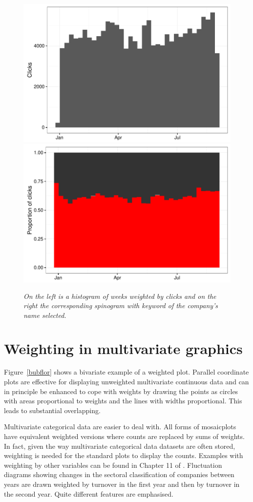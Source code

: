 \documentclass{svmult}
\begin{document}
\begin{figure}[htbp]
  \centering
  \includegraphics[width=0.5\linewidth]{web-clicks}%
  \includegraphics[width=0.5\linewidth]{web-clicks-stacked}
  \caption{\label{webwords2}\em On the left is a histogram of weeks weighted by clicks and on the right the corresponding spinogram with keyword of the company's name selected.}
\end{figure}


\section{Weighting in multivariate graphics}
\label{mv}
Figure~\ref{bubflor} shows a bivariate example of a weighted plot.  Parallel coordinate plots are effective for displaying unweighted multivariate continuous data and can in principle be enhanced to cope with weights by drawing the points as circles with areas proportional to weights and the lines with widths proportional.  This leads to substantial overlapping.

Multivariate categorical data are easier to deal with.  All forms of mosaicplots have equivalent weighted versions where counts are replaced by sums of weights.  In fact, given the way multivariate categorical data datasets are often stored, weighting is needed for the standard plots to display the counts.  Examples with weighting by other variables can be found in Chapter 11 of \cite{unwin:2006}.  Fluctuation diagrams showing changes in the sectoral classification of companies between years are drawn weighted by turnover in the first year and then by turnover in the second year.  Quite different features are emphasised.
\end{document}
